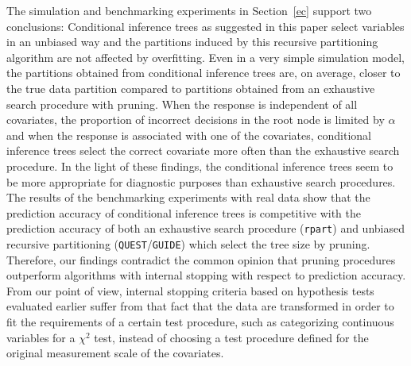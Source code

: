 The simulation and benchmarking experiments in Section~\ref{ec} support two
conclusions: Conditional inference trees as suggested in this paper select
variables in an unbiased way and the partitions induced by this recursive
partitioning algorithm are not affected by overfitting. Even in a very
simple simulation model, the partitions obtained from conditional inference
trees are, on average, closer to the true data partition compared to
partitions obtained from an exhaustive search procedure with pruning. 
When the response is independent of all covariates, the
proportion of incorrect decisions in the root node 
is limited by $\alpha$ and when the response is
associated with one of the covariates, conditional inference trees select
the correct covariate more often than the exhaustive search procedure.
In the light of these findings, the conditional inference trees seem to be
more appropriate for diagnostic purposes than exhaustive search procedures. 
The results of
the benchmarking experiments with real data show that the prediction
accuracy of conditional inference trees is competitive with the
prediction accuracy of both an exhaustive search procedure 
(\texttt{rpart}) and unbiased recursive partitioning (\texttt{QUEST}/\texttt{GUIDE})
which select the tree size by pruning. 
Therefore, our findings
contradict the common opinion that pruning procedures outperform algorithms
with internal stopping with respect to prediction accuracy. 
From our point of view, internal stopping criteria based on hypothesis tests 
evaluated earlier \citep[see for example the results of][]{FrankWitten1998} suffer from 
that fact that the data are transformed in order to fit the requirements of
a certain test procedure, such as categorizing continuous variables for a
$\chi^2$ test,
instead of choosing 
a test procedure defined for the original measurement scale of the
covariates.

